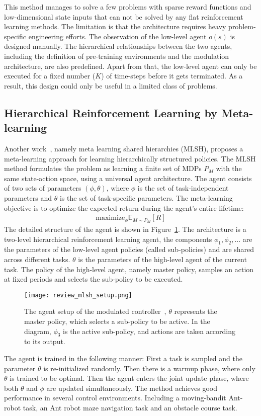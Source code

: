 This method manages to solve a few problems with sparse reward functions and low-dimensional state inputs that can not be solved by any flat reinforcement learning methods. The limitation is that the architecture requires heavy problem-specific engineering efforts. The observation of the low-level agent $o(s)$ is designed manually. The hierarchical relationships between the two agents, including the definition of pre-training environments and the modulation architecture, are also predefined. Apart from that, the low-level agent can only be executed for a fixed number ($K$) of time-steps before it gets terminated. As a result, this design could only be useful in a limited class of problems.

\subsection{Hierarchical Reinforcement Learning by Meta-learning}
Another work~\cite{frans2017meta}, namely meta learning shared hierarchies (MLSH), proposes a meta-learning approach for learning hierarchically structured policies.
The MLSH method formulates the problem as learning a finite set of MDPs $P_M$ with the same state-action space, using a universal agent architecture. The agent consists of two sets of parameters $(\phi,\theta)$, where $\phi$ is the set of task-independent parameters and $\theta$ is the set of task-specific parameters. The meta-learning objective is to optimize the expected return during the agent's entire lifetime:
\begin{align}
\mathrm{maximize}_\phi \mathbb{E}_{M\sim P_M}[R]
\end{align}
The detailed structure of the agent is shown in Figure~\ref{review_mlsh_arch}. The architecture is a two-level hierarchical reinforcement learning agent, the components $\phi_1,\phi_2,\dots$ are the parameters of the low-level agent policies (called sub-policies) and are shared across different tasks. $\theta$ is the parameters of the high-level agent of the current task. The policy of the high-level agent, namely master policy, samples an action at fixed periods and selects the sub-policy to be executed.
\begin{figure}[h]
	\texttt{[image: review\_mlsh\_setup.png]}
	\centering
	\caption{The agent setup of the modulated controller~\cite{frans2017meta}, $\theta$ represents the master policy, which selects
		a sub-policy to be active. In the diagram, $\phi_3$ is the active sub-policy, and actions are taken according
		to its output.}\label{review_mlsh_arch}
\end{figure}
The agent is trained in the following manner: First a task is sampled and the parameter $\theta$ is re-initialized randomly. Then there is a warmup phase, where only $\theta$ is trained to be optimal. Then the agent enters the joint update phase, where both $\theta$ and $\phi$ are updated simultaneously.
The method achieves good performance in several control environments. Including a moving-bandit Ant-robot task, an Ant robot maze navigation task and an obstacle course task. 

